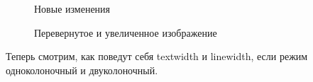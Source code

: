 \documentclass[
  english,
  russian,
  12pt,
  a4paper,
  DIV=11,
  numbers=noendperiod]{scrreprt}
\begin{document}
\begin{figure}


\caption{\label{fig-019}Новые изменения}

\end{figure}%

\begin{figure}


\caption{\label{fig-020}Перевернутое и увеличенное изображение}

\end{figure}%

Теперь смотрим, как поведут себя textwidth и linewidth, если режим
одноколоночный и двуколоночный.
\end{document}
